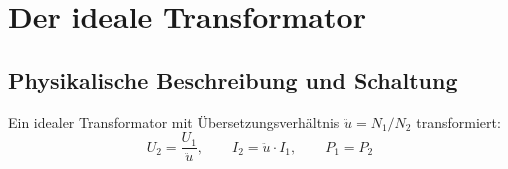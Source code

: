 ﻿\documentclass[12pt, a4paper]{article}
\begin{document}
	\section{Der ideale Transformator}
	
	\subsection{Physikalische Beschreibung und Schaltung}
	
	Ein idealer Transformator mit Übersetzungsverhältnis $\ddot{u} = N_1 / N_2$ transformiert:
	\begin{equation}
		U_2 = \frac{U_1}{\ddot{u}}, \qquad I_2 = \ddot{u} \cdot I_1, \qquad P_1 = P_2
		\label{eq:trafo}
	\end{equation}
	
\end{document}
